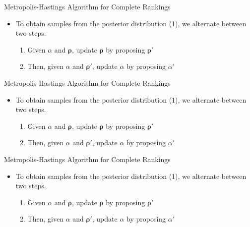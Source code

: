 \documentclass[11pt]{beamer}
\begin{document}
\begin{frame}{Metropolis-Hastings Algorithm for Complete Rankings}
\begin{itemize}
    \item To obtain samples from the posterior distribution (1), we alternate between two steps.
    \begin{enumerate}
        \item Given $\alpha$ and $\boldsymbol{\rho}$, update $\boldsymbol{\rho}$ by proposing $\boldsymbol{\rho}'$
        \item Then, given $\alpha$ and $\boldsymbol{\rho}'$, update $\alpha$ by proposing $\alpha'$
    \end{enumerate}
\end{itemize}
\end{frame}

\begin{frame}{Metropolis-Hastings Algorithm for Complete Rankings}
\begin{itemize}
    \item To obtain samples from the posterior distribution (1), we alternate between two steps.
    \begin{enumerate}
        \item Given $\alpha$ and $\boldsymbol{\rho}$, update $\boldsymbol{\rho}$ by proposing $\boldsymbol{\rho}'$
        \item Then, given $\alpha$ and $\boldsymbol{\rho}'$, update $\alpha$ by proposing $\alpha'$
    \end{enumerate}
\end{itemize}
\end{frame}

\begin{frame}{Metropolis-Hastings Algorithm for Complete Rankings}
\begin{itemize}
    \item To obtain samples from the posterior distribution (1), we alternate between two steps.
    \begin{enumerate}
        \item Given $\alpha$ and $\boldsymbol{\rho}$, update $\boldsymbol{\rho}$ by proposing $\boldsymbol{\rho}'$
        \item Then, given $\alpha$ and $\boldsymbol{\rho}'$, update $\alpha$ by proposing $\alpha'$
    \end{enumerate}
\end{itemize}
\end{frame}
\end{document}
